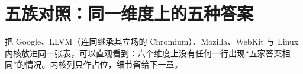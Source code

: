 \documentclass[12pt,a4paper,fontset=fandol]{ctexbook}
\newcommand{\Lang}[1]{\textsf{#1}}
\newcommand{\DomGo}{\Lang{Google}}
\newcommand{\DomLlvm}{\Lang{LLVM}}
\begin{document}
\section{五族对照：同一维度上的五种答案}
\label{sec:ch04-compare-table}

把 \DomGo、\DomLlvm（连同继承其立场的 Chromium）、Mozilla、WebKit 与 Linux 内核放进同一张表，可以直观看到：六个维度上没有任何一行出现``五家答案相同''的情况。内核列只作占位，细节留给下一章。

{\small\begin{longtable}{%
  >{\raggedright\arraybackslash}p{}%
  >{\raggedright\arraybackslash}p{}%
  >{\raggedright\arraybackslash}p{}%
  >{\raggedright\arraybackslash}p{}%
  >{\raggedright\arraybackslash}p{}%
  >{\raggedright\arraybackslash}p{}}


\end{longtable}}
\end{document}
